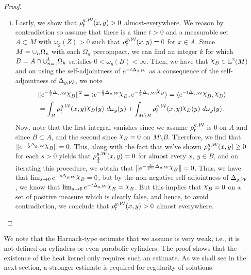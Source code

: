 \documentclass[a4paper, 12pt]{amsart}
\begin{document}
\begin{proof}
\begin{enumerate}[(i)]
\item Lastly, we show that $\rho^{g,\mathcal{W}}_t(x,y) > 0$  almost-everywhere.
	We reason by contradiction so assume that there
	is a time $t > 0$ and a measurable set $A \subset M$ with $\omega_g(Z) > 0$
	such that $\rho^{g,\mathcal{W}}_t(x,y) = 0$ for $x \in A$.
	Since $M = \cup_{n} \Omega_n$ with each 
	$\Omega_n$ precompact, we can find an integer
	$k$ for which $B = A \cap \cup_{n=1}^k \Omega_k$ 
	satisfies $0 < \omega_g(B) < \infty$. Then,
	we have that $\ind{B} \in \Lp{2}(M)$ and 
	on using the self-adjointness of $e^{-t\Delta_{g,\mathcal{W}}}$ as a consequence 
	of the self-adjointness of $\Delta_{g,\mathcal{W}}$,
	we note
	\begin{multline*}  
	\norm{e^{-\frac{t}{2} \Delta_{g,\cW}}\ind{B}}^2 
		 = \inprod{e^{-\frac{t}{2} \Delta_{g,\cW}} \ind{B}, e^{-{\frac{t}{2}}\Delta_{g,\cW} \ind{B}}}
		 = \inprod{e^{-t \Delta_{g,\cW}} \ind{B},\ind{B}} \\
		= \int_{B} \hk^{g,\cW}_t(x,y)\ind{B}(y)\ d\omega_g(y) + 
			\int_{M \setminus B} \hk^{g,\cW}_t(x,y)\ind{B}(y)\ d\omega_g(y).
	\end{multline*}
	Now, note that the first integral vanishes
	since we assume $\rho^{g,\mathcal{W}}_t$ is $0$ on $A$ and since $B \subset A$, 
	and the second since $\ind{B} = 0$ on $M \setminus B$.
	Therefore, we find that $\norm{e^{-\frac{t}{2} \Delta_{g,\cW}} \ind{B}} = 0$.
	This, along with the fact that we've shown $\rho^{g,\mathcal{W}}_s(x,y) \geq 0$ 
	for each $s > 0$ yields that $\rho^{g,\mathcal{W}}_{\frac{t}{2}}(x,y) = 0$ for 
	almost every $x,\ y \in B$, and on 
	iterating this procedure, we obtain that
	$\norm{e^{-\frac{t}{2^m} \Delta_{g,\cW}} \ind{B}} = 0$.
	Thus, we have that $\lim_{s\to 0} e^{-s \Delta_{g,\cW}} \ind{B} = 0$, 
	but by the non-negative self-adjointness of
	$\Delta_{g,\mathcal{W}}$, we know that $\lim_{s \to 0} e^{-t \Delta_{g,\cW}} \ind{B} = \ind{B}$.
	But this implies that $\ind{B} = 0$ on a set of positive measure which is clearly false, 
	and hence, to avoid contradiction, we conclude that $\rho^{g,\mathcal{W}}_t(x,y) > 0$ almost everywhere.
	\qedhere
\end{enumerate} 
\end{proof}

\begin{rem}
We note that the Harnack-type estimate that we assume is very 
weak, i.e., it is not defined on cylinders or even 
parabolic cylinders. The proof shows that the existence 
of the heat kernel only requires such an estimate. 
As we shall see in the next section, a stronger
estimate is required for regularity of solutions. 
\end{rem}
\end{document}
